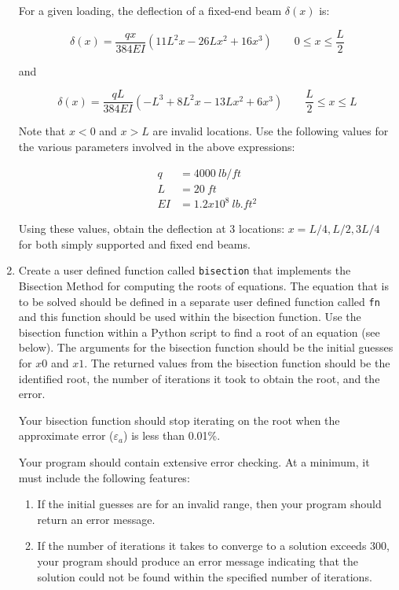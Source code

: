 \documentclass[a4paper,12pt]{article}
\begin{document}
\begin{enumerate}
	For a given loading, the deflection of a fixed-end beam $\delta(x)$ is:
	
	\begin{equation*}
	\delta(x) = \frac{q x}{384EI}(11L^2x - 26Lx^2 + 16x^3) \qquad 0 \le x \le \frac{L}{2}
	\end{equation*}
	
	and 
	
	\begin{equation*}
	\delta(x) = \frac{q L}{384EI}( -L^3  + 8L^2x - 13Lx^2 + 6x^3) \qquad \frac{L}{2} \le x \le L
	\end{equation*}
	
	Note that $x < 0$ and $x > L$ are invalid locations. Use the following values for the various parameters involved in the above expressions:
	
	\begin{align*}
		q & = 4000 ~lb/ft\\
		L & = 20 ~ft\\
		EI & = 1.2x10^8 ~lb.ft^2
	\end{align*}
	
	Using these values, obtain the deflection at 3 locations: $x = L/4, L/2, 3L/4$ for both simply supported and fixed end beams.
	
	\item Create a user defined function called \verb|bisection| that implements the Bisection Method for computing the roots of equations. The equation that is to be solved should be defined in a separate user defined function called \verb|fn| and this function should be used within the bisection function. Use the bisection function within a Python script to find a root of an equation (see below).
	The arguments for the bisection function should be the initial guesses for $x0$ and $x1$.  The returned values from the bisection function should be the identified root, the number of iterations it took to obtain the root, and the error. 
	
	Your bisection function should stop iterating on the root when the approximate error ($\varepsilon_a$) is less than 0.01\%.

	Your program should contain extensive error checking. At a minimum, it must include the following features:
	\begin{enumerate}
		\item If the initial guesses are for an invalid range, then your program should return an error message.
		\item If the number of iterations it takes to converge to a solution exceeds 300, your program should produce an error message indicating that the solution could not be found within the specified number of iterations.
	\end{enumerate}


\end{enumerate}
\end{document}
